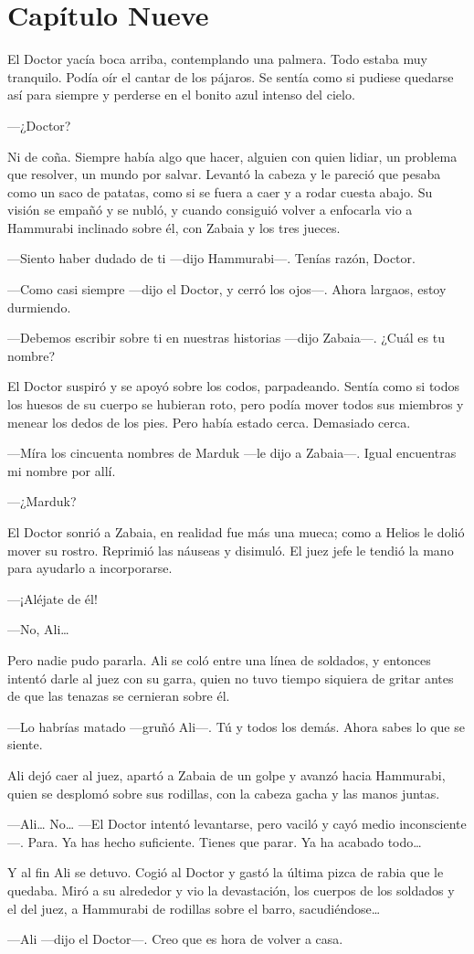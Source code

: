 \chapter*{Capítulo Nueve}


El Doctor yacía boca arriba, contemplando una palmera. Todo estaba muy
tranquilo. Podía oír el cantar de los pájaros. Se sentía como si pudiese
quedarse así para siempre y perderse en el bonito azul intenso del
cielo.

---¿Doctor?

Ni de coña. Siempre había algo que hacer, alguien con quien lidiar, un
problema que resolver, un mundo por salvar. Levantó la cabeza y le
pareció que pesaba como un saco de patatas, como si se fuera a caer y a
rodar cuesta abajo. Su visión se empañó y se nubló, y cuando consiguió
volver a enfocarla vio a Hammurabi inclinado sobre él, con Zabaia y los
tres jueces.

---Siento haber dudado de ti ---dijo Hammurabi---. Tenías razón, Doctor.

---Como casi siempre ---dijo el Doctor, y cerró los ojos---. Ahora
largaos, estoy durmiendo.

---Debemos escribir sobre ti en nuestras historias ---dijo Zabaia---.
¿Cuál es tu nombre?

El Doctor suspiró y se apoyó sobre los codos, parpadeando. Sentía como
si todos los huesos de su cuerpo se hubieran roto, pero podía mover
todos sus miembros y menear los dedos de los pies. Pero había estado
cerca. Demasiado cerca.

---Míra los cincuenta nombres de Marduk ---le dijo a Zabaia---. Igual
encuentras mi nombre por allí.

---¿Marduk?

El Doctor sonrió a Zabaia, en realidad fue más una mueca; como a Helios
le dolió mover su rostro. Reprimió las náuseas y disimuló. El juez jefe
le tendió la mano para ayudarlo a incorporarse.

---¡Aléjate de él!

---No, Ali\ldots{}

Pero nadie pudo pararla. Ali se coló entre una línea de soldados, y
entonces intentó darle al juez con su garra, quien no tuvo tiempo
siquiera de gritar antes de que las tenazas se cernieran sobre él.

---Lo habrías matado ---gruñó Ali---. Tú y todos los demás. Ahora sabes
lo que se siente.

Ali dejó caer al juez, apartó a Zabaia de un golpe y avanzó hacia
Hammurabi, quien se desplomó sobre sus rodillas, con la cabeza gacha y
las manos juntas.

---Ali\ldots{} No\ldots{} ---El Doctor intentó levantarse, pero vaciló y
cayó medio inconsciente---. Para. Ya has hecho suficiente. Tienes que
parar. Ya ha acabado todo\ldots{}

Y al fin Ali se detuvo. Cogió al Doctor y gastó la última pizca de rabia
que le quedaba. Miró a su alrededor y vio la devastación, los cuerpos de
los soldados y el del juez, a Hammurabi de rodillas sobre el barro,
sacudiéndose\ldots{}

---Ali ---dijo el Doctor---. Creo que es hora de volver a casa.